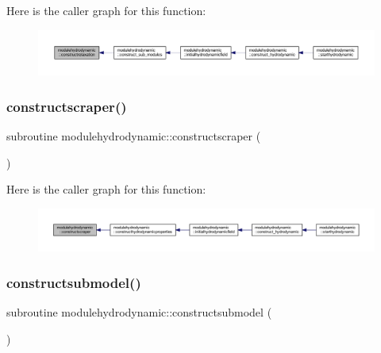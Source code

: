 Here is the caller graph for this function\+:\nopagebreak
\begin{figure}[H]
\begin{center}
\leavevmode
\includegraphics[width=350pt]{namespacemodulehydrodynamic_ac37871a130f9232cb11f29fc34327f44_icgraph}
\end{center}
\end{figure}
\mbox{\label{namespacemodulehydrodynamic_aced773f111ad70fa9ce5069abbc8a7eb}} 
\subsubsection{\texorpdfstring{constructscraper()}{constructscraper()}}
{\footnotesize\ttfamily subroutine modulehydrodynamic\+::constructscraper (\begin{DoxyParamCaption}{ }\end{DoxyParamCaption})\hspace{0.3cm}{\ttfamily [private]}}

Here is the caller graph for this function\+:\nopagebreak
\begin{figure}[H]
\begin{center}
\leavevmode
\includegraphics[width=350pt]{namespacemodulehydrodynamic_aced773f111ad70fa9ce5069abbc8a7eb_icgraph}
\end{center}
\end{figure}
\mbox{\label{namespacemodulehydrodynamic_a2892f053e17fe9b586d237a8b6684326}} 
\subsubsection{\texorpdfstring{constructsubmodel()}{constructsubmodel()}}
{\footnotesize\ttfamily subroutine modulehydrodynamic\+::constructsubmodel (\begin{DoxyParamCaption}{ }\end{DoxyParamCaption})\hspace{0.3cm}{\ttfamily [private]}}

